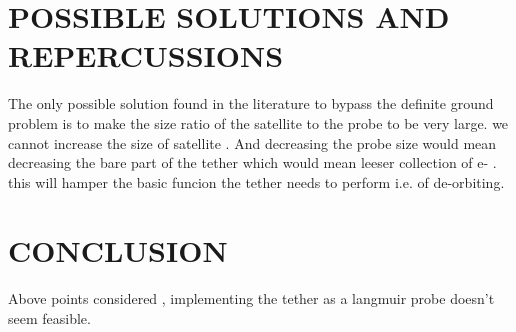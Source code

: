 \documentclass[12pt, a4paper, oneside]{book}
\begin{document}
	\section{POSSIBLE SOLUTIONS AND REPERCUSSIONS}
	
	The only possible solution found in the literature to bypass the definite ground problem is to make the size ratio of the satellite to the probe to be very large. we cannot increase the size of satellite . And decreasing the probe size would mean decreasing the bare part of the tether which would mean leeser collection of e- . this will hamper the basic funcion the tether needs to perform i.e. of de-orbiting.
	
	\section{CONCLUSION}
	Above points considered , implementing the tether as a langmuir probe doesn't seem feasible.
	
	 
\end{document}
